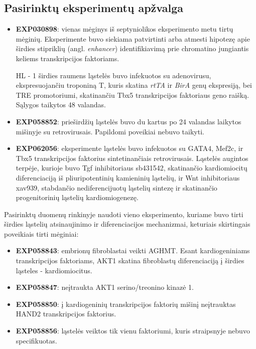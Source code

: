 \documentclass[12pt]{article}
\begin{document}
\subsection{Pasirinktų eksperimentų apžvalga}
\begin{itemize}
    \item \textbf{EXP030898}: vienas mėginys iš septyniolikos eksperimento
        metu tirtų mėginių. Eksperimente buvo siekiama patvirtinti arba
        atmesti hipotezę apie širdies stipriklių (angl. \emph{enhancer})
        identifikiavimą prie chromatino jungiantis keliems transkripcijos
        faktoriams.

        HL - 1 širdies raumens ląstelės buvo infekuotos su adenovirusu,
        ekspresuojančiu troponiną T, kuris skatina \emph{rtTA} ir \emph{BirA}
        genų ekspresiją, bei TRE promotoriumi, skatinančiu Tbx5 transkripcijos
        faktoriaus geno raišką. Sąlygos taikytos 48 valandas.
    \item \textbf{EXP058852}: prieširdžių ląstelės buvo du kartus po 24
        valandas laikytos mišinyje su retrovirusais. Papildomi poveikiai nebuvo
        taikyti.
    \item \textbf{EXP062056}: eksperimente ląstelės buvo infekuotos su GATA4,
        Mef2c, ir Tbx5 transkripcijos faktorius sintetinančiais retrovirusais.
        Ląstelės augintos terpėje, kurioje buvo {Tgf\textbeta} inhibitoriaus
        sb431542, skatinančio kardiomiocitų diferenciaciją iš pliuripotentinių
        kamieninių ląstelių, ir Wnt inhibitoriaus xav939, stabdančio
        nediferencijuotų ląstelių sintezę ir skatinančio progenitorinių
        ląstelių kardiomiogenezę.
\end{itemize}

Pasirinktų duomenų rinkinyje naudoti vieno eksperimento, kuriame buvo tirti
širdies ląstelių atsinaujinimo ir diferenciacijos mechanizmai, keturiais
skirtingais poveikiais tirti mėginiai:

\begin{itemize}
    \item \textbf{EXP058843}: embrionų fibroblastai veikti AGHMT. Esant
        kardiogeniniams transkripcijos faktoriams, AKT1 skatina fibroblastų
        diferenciaciją į širdies ląsteles - kardiomiocitus.
    \item \textbf{EXP058847}: neįtraukta AKT1 serino/treonino kinazė 1.
    \item \textbf{EXP058850}: į kardiogeninių transkripcijos faktorių mišinį
        neįtrauktas HAND2 transkripcijos faktorius.
    \item \textbf{EXP058856}: ląstelės veiktos tik vienu faktoriumi, kuris
        straipsnyje nebuvo specifikuotas.
  \end{itemize}
\newpage
\end{document}

